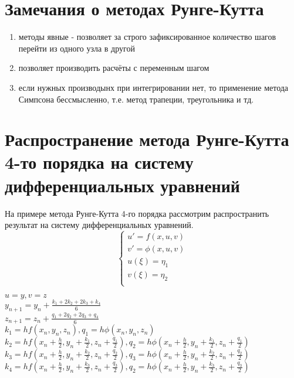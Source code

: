 \section{Замечания о методах Рунге-Кутта}
\begin{enumerate}
\item методы явные - позволяет за строго зафиксированное количество шагов перейти из одного узла в другой
\item позволяет производить расчёты с переменным шагом
\item если нужных производынх при интегрировании нет, то применение метода Симпсона бессмысленно, т.е. метод трапеции, треугольника и тд.
\end{enumerate}

\section{Распространение метода Рунге-Кутта 4-то порядка на систему дифференциальных уравнений}
На примере метода Рунге-Кутта 4-го порядка рассмотрим распространить результат на систему дифференциальных уравнений.\\
\begin{equation}
\begin{cases}
u' = f(x, u, v)\\
v' = \phi(x, u, v)\\
u(\xi) = \eta_{1}\\
v(\xi) = \eta_{2}\\
\end{cases}
\end{equation}

$u = y, v = z$\\

$y_{n+1} = y_{n} + \frac{k_{1} + 2k_{2} + 2k_{3} + k_{4}}{6}$\\
$z_{n+1} = z_{n} + \frac{q_{1} + 2q_{2} + 2q_{3} + q_{4}}{6}$\\
$k_{1} = h f(x_{n}, y_{n}, z_{n}), q_{1} = h \phi(x_{n}, y_{n}, z_{n})$\\
$k_{2} = h f(x_{n} + \frac{h}{2}, y_{n} + \frac{k_{1}}{2}, z_{n} + \frac{q_{1}}{2}), q_{2} = h \phi(x_{n} + \frac{h}{2}, y_{n} + \frac{k_{1}}{2}, z_{n} + \frac{q_{1}}{2})$\\
$k_{3} = h f(x_{n} + \frac{h}{2}, y_{n} + \frac{k_{2}}{2}, z_{n} + \frac{q_{2}}{2}), q_{3} = h \phi(x_{n} + \frac{h}{2}, y_{n} + \frac{k_{2}}{2}, z_{n} + \frac{q_{2}}{2})$\\
$k_{4} = h f(x_{n} + \frac{h}{2}, y_{n} + \frac{k_{3}}{2}, z_{n} + \frac{q_{3}}{2}), q_{2} = h \phi(x_{n} + \frac{h}{2}, y_{n} + \frac{k_{3}}{2}, z_{n} + \frac{q_{3}}{2})$\\


